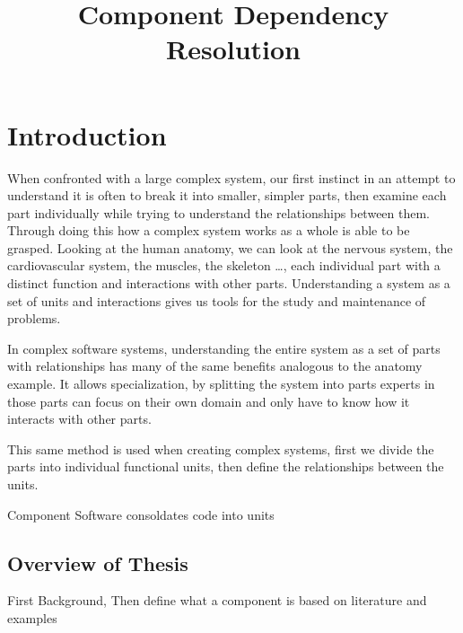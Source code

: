 \documentclass{report}
\title{Component Dependency Resolution}
\begin{document}
\chapter{Introduction}

{}When confronted with a large complex system, our first instinct in an attempt to understand it is often to break it into smaller, simpler parts, 
{}then examine each part individually while trying to understand the relationships between them.
{}Through doing this how a complex system works as a whole is able to be grasped.
{}Looking at the human anatomy, we can look at the nervous system, the cardiovascular system, the muscles, the skeleton \ldots,
{}each individual part with a distinct function and interactions with other parts.
{}Understanding a system as a set of units and interactions gives us tools for the study and maintenance of problems.  

{}In complex software systems, understanding the entire system as a set of parts with relationships has many of the same benefits analogous to the anatomy example.
{}It allows specialization, 
{}by splitting the system into parts experts in those parts can focus on their own domain and only have to know how it interacts with other parts.

{}This same method is used when creating complex systems, first we divide the parts into individual functional units,
{}then define the relationships between the units.


Component Software consoldates code into units


\section{Overview of Thesis}
First Background,
Then define what a component is based on literature and examples













\end{document}
